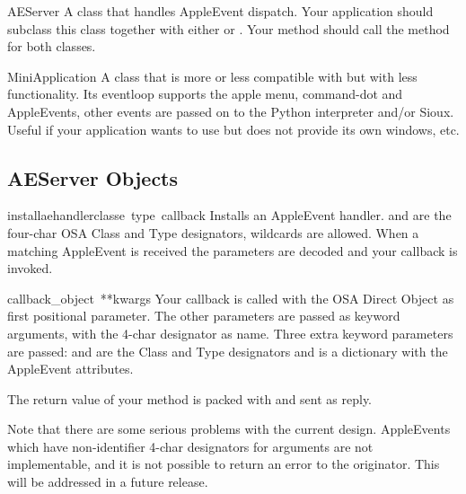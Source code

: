 \begin{funcdesc}{AEServer}{}
A class that handles AppleEvent dispatch. Your application should
subclass this class together with either
 or
. Your  method should call
the  method for both classes.
\end{funcdesc}

\begin{funcdesc}{MiniApplication}{}
A class that is more or less compatible with
 but with less functionality. Its
eventloop supports the apple menu, command-dot and AppleEvents, other
events are passed on to the Python interpreter and/or Sioux.
Useful if your application wants to use  but does not
provide its own windows, etc.
\end{funcdesc}

\subsection{AEServer Objects}

\renewcommand{\indexsubitem}{(AEServer method)}

\begin{funcdesc}{installaehandler}{classe\, type\, callback}
Installs an AppleEvent handler.  and  are the
four-char OSA Class and Type designators,  wildcards are
allowed. When a matching AppleEvent is received the parameters are
decoded and your callback is invoked.
\end{funcdesc}

\begin{funcdesc}{callback}{_object\, **kwargs}
Your callback is called with the OSA Direct Object as first positional
parameter. The other parameters are passed as keyword arguments, with
the 4-char designator as name. Three extra keyword parameters are
passed:  and  are the Class and Type
designators and  is a dictionary with the AppleEvent
attributes.

The return value of your method is packed with
 and sent as reply.
\end{funcdesc}

Note that there are some serious problems with the current
design. AppleEvents which have non-identifier 4-char designators for
arguments are not implementable, and it is not possible to return an
error to the originator. This will be addressed in a future release.
